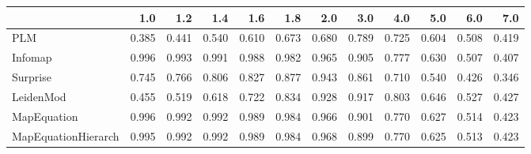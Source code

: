 \begin{tabular}{lrrrrrrrrrrr}
\toprule
{} &   1.0 &   1.2 &   1.4 &   1.6 &   1.8 &   2.0 &   3.0 &   4.0 &   5.0 &   6.0 &   7.0 \\
\midrule
PLM                 & 0.385 & 0.441 & 0.540 & 0.610 & 0.673 & 0.680 & 0.789 & 0.725 & 0.604 & 0.508 & 0.419 \\
Infomap             & 0.996 & 0.993 & 0.991 & 0.988 & 0.982 & 0.965 & 0.905 & 0.777 & 0.630 & 0.507 & 0.407 \\
Surprise            & 0.745 & 0.766 & 0.806 & 0.827 & 0.877 & 0.943 & 0.861 & 0.710 & 0.540 & 0.426 & 0.346 \\
LeidenMod           & 0.455 & 0.519 & 0.618 & 0.722 & 0.834 & 0.928 & 0.917 & 0.803 & 0.646 & 0.527 & 0.427 \\
MapEquation         & 0.996 & 0.992 & 0.992 & 0.989 & 0.984 & 0.966 & 0.901 & 0.770 & 0.627 & 0.514 & 0.423 \\
MapEquationHierarch & 0.995 & 0.992 & 0.992 & 0.989 & 0.984 & 0.968 & 0.899 & 0.770 & 0.625 & 0.513 & 0.423 \\
\bottomrule
\end{tabular}
